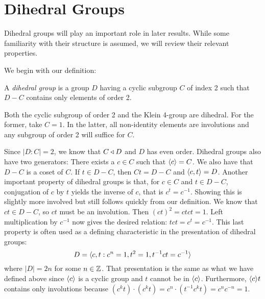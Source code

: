 \documentclass[main.tex]{subfiles}
\begin{document}
\chapter{Dihedral Groups}

Dihedral groups will play an important role in later results. While some familiarity with their structure is assumed, we will review their relevant properties.

\hss

We begin with our definition:

\hss

\begin{definition}
A \emph{dihedral group} is a group $D$ having a cyclic subgroup $C$ of index 2 such that $D - C$ contains only elements of order 2.
\end{definition}

\begin{remark}
Both the cyclic subgroup of order 2 and the Klein 4-group are dihedral. For the former, take $C = 1$. In the latter, all non-identity elements are involutions and any subgroup of order 2 will suffice for $C$.
\end{remark}

\hss

Since $|D : C| = 2$, we know that $C \triangleleft D$ and $D$ has even order. Dihedral groups also have two generators: There exists a $c \in C$ such that $\langle c \rangle = C$. We also have that $D - C$ is a coset of $C$. If $t \in D - C$, then $Ct = D - C$ and $\langle c,t \rangle = D$. Another important property of dihedral groups is that, for $c \in C$ and $t \in D - C$, conjugation of $c$ by $t$ yields the inverse of $c$, that is $c^t = c^{-1}$. Showing this is slightly more involved but still follows quickly from our definition. We know that $ct \in D - C$, so $ct$ must be an involution. Then $(ct)^2 = ctct = 1$. Left multiplication by $c^{-1}$ now gives the desired relation: $tct = c^t = c^{-1}$. This last property is often used as a defining characteristic in the presentation of dihedral groups: 
$$D = \langle c, t : c^n = 1, t^2 = 1, t^{-1}ct = c^{-1} \rangle$$
where $|D| = 2n$ for some $n \in \mathbb{Z}$. That presentation is the same as what we have defined above since $\langle c \rangle$ is a cyclic group and $t$ cannot be in $\langle c \rangle$. Furthermore, $\langle c \rangle t$ contains only involutions because $(c^k t) \cdot (c^k t) = c^n \cdot (t^{-1} c^k t) = c^n c^{-n} = 1$.
\end{document}
